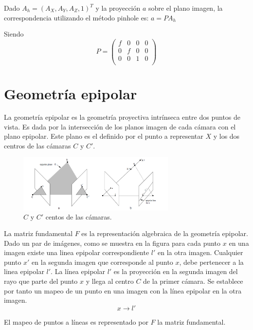 Dado $A_h = (A_X,A_Y,A_Z,1)^T$ y la proyección $a$ sobre el plano imagen, la correspondencia utilizando el método pinhole es:
$a=PA_h$

Siendo
\[
P = 
\begin{pmatrix}
f & 0 & 0 & 0 \\
0 & f & 0 & 0 \\
0 & 0 & 1 & 0 \\
\end{pmatrix}
\]

\section{Geometría epipolar}
La geometría epipolar\cite{LibroCompGrafica3} es la geometría proyectiva intrínseca entre dos puntos de vista. Es dada por la intersección de los planos imagen de cada cámara con el plano epipolar. Este plano es el definido por el punto a representar $X$ y los dos centros de las cámaras $C$ y $C'$.

\begin{figure}[H]
  \centering
    \includegraphics[width=0.7\textwidth]{./Cap2_videomapping/epipolar.PNG}
  \caption[Multiple View Geometry in Computer Vision, Fig. 9.1]{$C$ y $C'$ centos de las cámaras.}
  \label{fig:Epipolar}
\end{figure}
La matriz fundamental $F$ es la representación algebraica de la geometría epipolar.
Dado un par de imágenes, como se muestra en la figura para cada punto $x$ en una imagen existe una linea epipolar correspondiente $l'$ en la otra imagen. Cualquier punto $x'$ en la segunda imagen que corresponde al punto $x$, debe pertenecer a la linea epipolar $l'$.
La línea epipolar $l'$ es la proyección en la segunda imagen del rayo que parte del punto $x$ y llega al centro $C$ de la primer cámara. Se establece por tanto un mapeo de un punto en una imagen con la línea epipolar en la otra imagen.
\[  x \to l'
\]
 
El mapeo de puntos a líneas es representado por $F$ la matriz fundamental.

